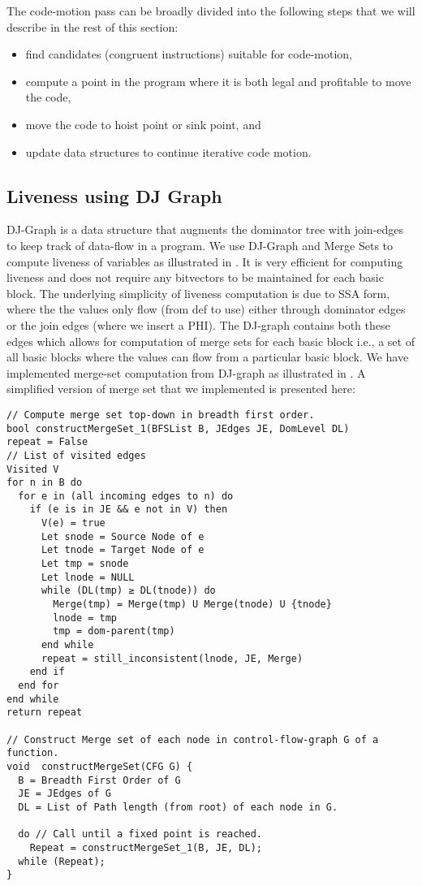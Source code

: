 \documentclass[acmlarge,review]{acmart}\settopmatter{printfolios=true}
\begin{document}
The code-motion pass can be broadly divided into the following steps that we will
describe in the rest of this section:
\begin{itemize}
\item find candidates (congruent instructions) suitable for code-motion,
\item compute a point in the program where it is both legal and profitable to
  move the code,
\item move the code to hoist point or sink point, and
\item update data structures to continue iterative code motion.
\end{itemize}

\subsection{Liveness using DJ Graph}
DJ-Graph \cite{Sreedhar1996} is a data structure that augments the dominator
tree with join-edges to keep track of data-flow in a program. We use DJ-Graph
and Merge Sets to compute liveness of variables as illustrated in
\cite{das2012}.  It is very efficient for computing liveness and does not
require any bitvectors to be maintained for each basic block. The underlying
simplicity of liveness computation is due to SSA form, where the the values only
flow (from def to use) either through dominator edges or the join edges (where
we insert a PHI). The DJ-graph contains both these edges which allows for
computation of merge sets for each basic block i.e., a set of all basic blocks
where the values can flow from a particular basic block. We have implemented
merge-set computation from DJ-graph as illustrated in \cite{das2005}. A simplified
version of merge set that we implemented is presented here:

\begin{verbatim}
// Compute merge set top-down in breadth first order.
bool constructMergeSet_1(BFSList B, JEdges JE, DomLevel DL)
repeat = False
// List of visited edges
Visited V
for n in B do
  for e in (all incoming edges to n) do
    if (e is in JE && e not in V) then
      V(e) = true
      Let snode = Source Node of e
      Let tnode = Target Node of e
      Let tmp = snode
      Let lnode = NULL
      while (DL(tmp) ≥ DL(tnode)) do
        Merge(tmp) = Merge(tmp) U Merge(tnode) U {tnode}
        lnode = tmp
        tmp = dom-parent(tmp)
      end while
      repeat = still_inconsistent(lnode, JE, Merge)
    end if
  end for
end while
return repeat

// Construct Merge set of each node in control-flow-graph G of a function.
void  constructMergeSet(CFG G) {
  B = Breadth First Order of G
  JE = JEdges of G
  DL = List of Path length (from root) of each node in G.

  do // Call until a fixed point is reached.
    Repeat = constructMergeSet_1(B, JE, DL);
  while (Repeat);
}
\end{verbatim}
\end{document}
